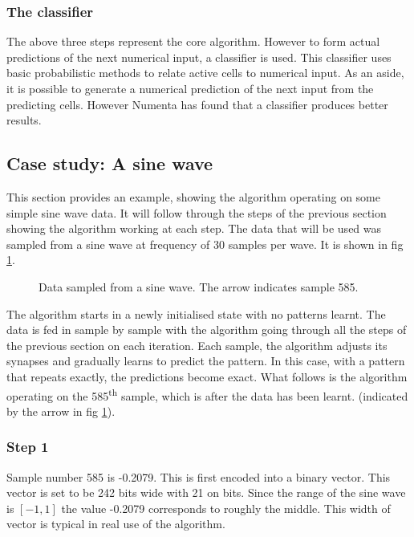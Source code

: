 \documentclass[a4paper]{jpconf}
\begin{document}
		\subsubsection{The classifier}
			The above three steps represent the core algorithm. However to form actual predictions of the next numerical input, a classifier is used. This classifier uses basic probabilistic methods to relate active cells to numerical input. As an aside, it is possible to generate a numerical prediction of the next input from the predicting cells. However Numenta has found that a classifier produces better results.
						 
	\subsection{Case study: A sine wave}
		This section provides an example, showing the algorithm operating on some simple sine wave data. It will follow through the steps of the previous section showing the algorithm working at each step. The data that will be used was sampled from a sine wave at frequency of 30 samples per wave. It is shown in fig \ref{fig:exampleData}.
		\begin{figure}
		\centering
		\caption{\label{fig:exampleData}Data sampled from a sine wave. The arrow indicates sample 585.}
		\end{figure}
		
		The algorithm starts in a newly initialised state with no patterns learnt. The data is fed in sample by sample with the algorithm going through all the steps of the previous section on each iteration. Each sample, the algorithm adjusts its synapses and gradually learns to predict the pattern. In this case, with a pattern that repeats exactly, the predictions become exact. What follows is the algorithm operating on the 585\textsuperscript{th} sample, which is after the data has been learnt. (indicated by the arrow in fig \ref{fig:exampleData}).
		
		\subsubsection*{Step 1}
			Sample number 585 is -0.2079. This is first encoded into a binary vector. This vector is set to be 242 bits wide with 21 on bits. Since the range of the sine wave is $\left[-1,1\right]$ the value -0.2079 corresponds to roughly the middle. This width of vector is typical in real use of the algorithm.
			
\end{document}
